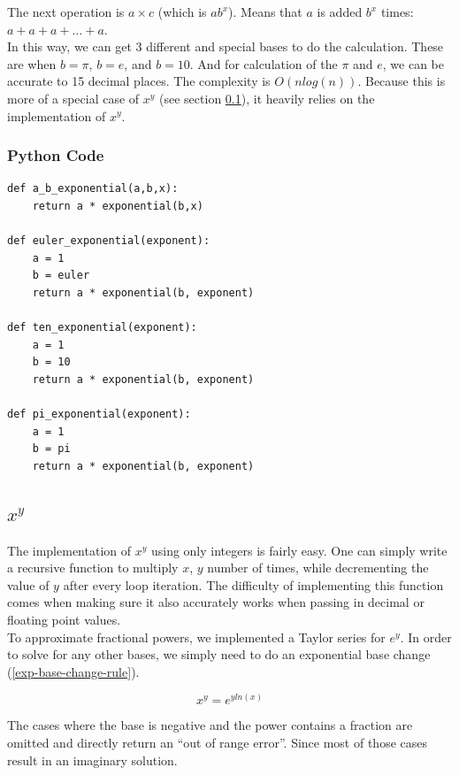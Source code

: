 \documentclass[11pt,onside]{report}
\begin{document}
The next operation is $a \times c$ (which is $ab^x$). Means that $a$ is added $b^x$ times: $a + a + a + \ldots + a$. \\

In this way, we can get 3 different and special bases to do the calculation. These are when $b = \pi$, $b = e$, and $b = 10$. And for calculation of the $\pi$ and $e$, we can be accurate to 15 decimal places. The complexity is $O(nlog(n))$. Because this is more of a special case of $x^y$ (see section \ref{exp-implementation}), it heavily relies on the implementation of $x^y$.

\subsubsection{Python Code}
\begin{lstlisting}
def a_b_exponential(a,b,x):
    return a * exponential(b,x)
    
def euler_exponential(exponent):
    a = 1
    b = euler
    return a * exponential(b, exponent)

def ten_exponential(exponent):
    a = 1
    b = 10
    return a * exponential(b, exponent)

def pi_exponential(exponent):
    a = 1
    b = pi
    return a * exponential(b, exponent)
\end{lstlisting}

\subsection{$x^y$} \label{exp-implementation}
The implementation of $x^y$ using only integers is fairly easy. One can simply write a recursive function to multiply $x$, $y$ number of times, while decrementing the value of $y$ after every loop iteration. The difficulty of implementing this function comes when making sure it also accurately works when passing in decimal or floating point values. \\

To approximate fractional powers, we implemented a Taylor series for $e^y$. In order to solve for any other bases, we simply need to do an exponential base change (\ref{exp-base-change-rule}).   

\begin{equation} \label{exp-base-change-rule}
    x^y = e^{y ln(x)} 
\end{equation}

The cases where the base is negative and the power contains a fraction are omitted and directly return an “out of range error”. Since most of those cases result in an  imaginary solution. \cite{implementing-exp}
\end{document}
